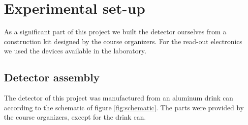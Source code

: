 \documentclass[a4paper]{article}
\newenvironment{todo}{
\color{red}
}
{
}
\begin{document}

\clearpage
\section{Experimental set-up}
\label{setup}
As a significant part of this project we built the detector ourselves from a construction kit designed by the course organizers.
For the read-out electronics we used the devices available in the laboratory.


\subsection{Detector assembly}
\label{assembly}
The detector of this project was manufactured from an aluminum drink can according to the schematic of figure \ref{fig:schematic}.
The parts were provided by the course organizers, except for the drink can.
\end{document}
